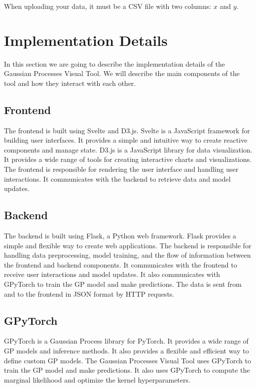 \documentclass[preprint,journal]{vgtc}       %
\begin{document}
When uploading your data, it must be a CSV file with two columns: $x$ and $y$.

\section{Implementation Details}

In this section we are going to describe the implementation details of the Gaussian Processes Visual Tool. We will describe the main components of the tool and how they interact with each other.

\subsection{Frontend}

The frontend is built using Svelte and D3.js. Svelte is a JavaScript framework for building user interfaces. It provides a simple and intuitive way to create reactive components and manage state. D3.js is a JavaScript library for data visualization. It provides a wide range of tools for creating interactive charts and visualizations. The frontend is responsible for rendering the user interface and handling user interactions. It communicates with the backend to retrieve data and model updates.

\subsection{Backend}

The backend is built using Flask, a Python web framework. Flask provides a simple and flexible way to create web applications. The backend is responsible for handling data preprocessing, model training, and the flow of information between the frontend and backend components. It communicates with the frontend to receive user interactions and model updates. It also communicates with GPyTorch to train the GP model and make predictions. The data is sent from and to the frontend in JSON format by HTTP requests.

\subsection{GPyTorch}

GPyTorch is a Gaussian Process library for PyTorch. It provides a wide range of GP models and inference methods. It also provides a flexible and efficient way to define custom GP models. The Gaussian Processes Visual Tool uses GPyTorch to train the GP model and make predictions. It also uses GPyTorch to compute the marginal likelihood and optimize the kernel hyperparameters.
\end{document}
